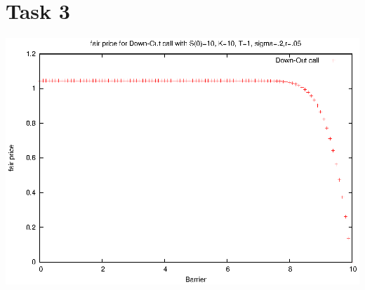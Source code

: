 \documentclass[]{article}
\begin{document}
\section*{Task 3}
\includegraphics[width=.9\textwidth]{task3.eps}\\
\end{document}
